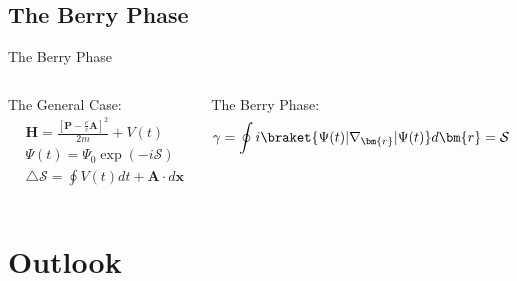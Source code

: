 \documentclass[9pt]{beamer}
\begin{document}
\subsection{The Berry Phase}
\begin{frame}{The Berry Phase}
 
  \begin{columns}[t]
    \begin{column}{0.6\textwidth}

      The General Case:
      \begin{align*}
          &\bm{H} = \frac{\left[ \bm{P} - \frac{e}{c}\bm{A} \right]^{2}}{2m} + V(t) \\
          &\Psi(t) = \Psi_{0} \exp(-i \mathcal{S}) \\
          &\triangle \mathcal{S} = \oint V(t) dt + \bm{A} \cdot d\bm{x} 
      \end{align*}


    \end{column}

    \begin{column}{0.4\textwidth}

      The Berry Phase:
      \begin{equation*}
        \gamma = \oint i\braket{\Psi(t)|\nabla_{\bm{r}}|\Psi(t)} d\bm{r} = \mathcal{S}
      \end{equation*}

    \end{column}

  \end{columns}
\end{frame}

\section{Outlook}

      
\end{document}
